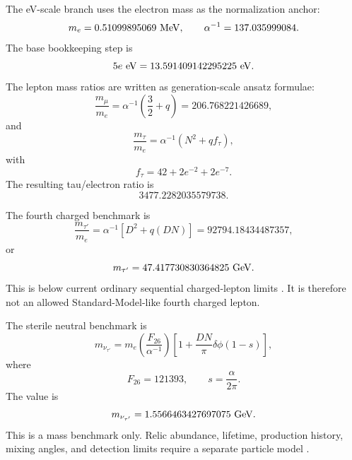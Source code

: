 \documentclass[11pt]{article}
\begin{document}
The eV-scale branch uses the electron mass as the normalization anchor:
\begin{equation}
    m_e=0.51099895069~{\rm MeV},
    \qquad
    \alpha^{-1}=137.035999084.
\end{equation}
The base bookkeeping step is
\begin{equation}
    5e~{\rm eV}=13.591409142295225~{\rm eV}.
\end{equation}
The lepton mass ratios are written as generation-scale ansatz formulae:
\begin{equation}
    \frac{m_\mu}{m_e}
    =
    \alpha^{-1}\left(\frac{3}{2}+q\right)
    =
    206.768221426689,
\end{equation}
and
\begin{equation}
    \frac{m_\tau}{m_e}
    =
    \alpha^{-1}\left(N^2+qf_\tau\right),
\end{equation}
with
\begin{equation}
    f_\tau=42+2e^{-2}+2e^{-7}.
\end{equation}
The resulting tau/electron ratio is
\begin{equation}
    3477.2282035579738.
\end{equation}

The fourth charged benchmark is
\begin{equation}
    \frac{m_{\tau'}}{m_e}
    =
    \alpha^{-1}\left[D^2+q(DN)\right]
    =
    92794.18434487357,
\end{equation}
or
\begin{equation}
    m_{\tau'}=47.417730830364825~{\rm GeV}.
\end{equation}
This is below current ordinary sequential charged-lepton limits
\cite{pdg2024}.  It is therefore not an allowed Standard-Model-like fourth
charged lepton.

The sterile neutral benchmark is
\begin{equation}
    m_{\nu_{\tau'}}
    =
    m_e
    \left(\frac{F_{26}}{\alpha^{-1}}\right)
    \left[
        1+\frac{DN}{\pi}\delta\phi(1-s)
    \right],
\end{equation}
where
\begin{equation}
    F_{26}=121393,\qquad s=\frac{\alpha}{2\pi}.
\end{equation}
The value is
\begin{equation}
    m_{\nu_{\tau'}}=1.5566463427697075~{\rm GeV}.
\end{equation}
This is a mass benchmark only.  Relic abundance, lifetime, production history,
mixing angles, and detection limits require a separate particle model
\cite{adhikari2017}.
\end{document}
